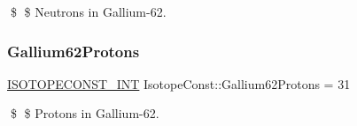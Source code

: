\$ \$ Neutrons in Gallium-\/62. \mbox{\label{group___isotope_const-_gallium-_ga62_ga1b96d7b558cf6669689c09244ef8cb12}} 
\subsubsection{\texorpdfstring{Gallium62\+Protons}{Gallium62Protons}}
{\footnotesize\ttfamily \mbox{\hyperlink{group___isotope_const-_macros_ga5f18360b3e99483a35c32d789e62621c}{I\+S\+O\+T\+O\+P\+E\+C\+O\+N\+S\+T\+\_\+\+I\+NT}} Isotope\+Const\+::\+Gallium62\+Protons = 31}

\$ \$ Protons in Gallium-\/62. 